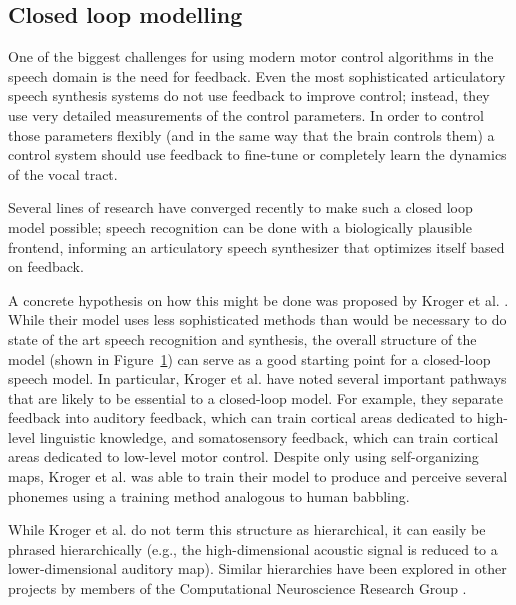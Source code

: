 \documentclass{article}
\begin{document}
\subsection{Closed loop modelling}

One of the biggest challenges
for using modern motor control algorithms
in the speech domain
is the need for feedback.
Even the most sophisticated
articulatory speech synthesis systems
do not use feedback to improve control;
instead, they use very detailed measurements
of the control parameters.
In order to control those parameters flexibly
(and in the same way that the brain controls them)
a control system should use feedback
to fine-tune or completely learn
the dynamics of the vocal tract.

Several lines of research have converged recently
to make such a closed loop model possible;
speech recognition can be done
with a biologically plausible frontend,
informing an articulatory speech synthesizer
that optimizes itself based on feedback.

A concrete hypothesis on how
this might be done was proposed by Kroger et al.
\citep{kroger2009}.
While their model uses less sophisticated
methods than would be necessary
to do state of the art speech
recognition and synthesis,
the overall structure of the model
(shown in Figure~\ref{fig:loop})
can serve as a good starting point
for a closed-loop speech model.
In particular, Kroger et al. have
noted several important pathways
that are likely to be essential
to a closed-loop model.
For example, they separate feedback
into auditory feedback,
which can train cortical areas
dedicated to high-level linguistic knowledge,
and somatosensory feedback,
which can train cortical areas
dedicated to low-level motor control.
Despite only using self-organizing maps,
Kroger et al. was able to train their model
to produce and perceive several phonemes
using a training method analogous
to human babbling.

\begin{figure}\begin{center}
  \label{fig:loop}
  \caption{}
\end{center}\end{figure}

While Kroger et al.
do not term this structure
as hierarchical,
it can easily be phrased hierarchically
(e.g., the high-dimensional acoustic
signal is reduced to a lower-dimensional
auditory map).
Similar hierarchies have been explored
in other projects by members of the
Computational Neuroscience Research Group
\citep[e.g.,]{eliasmith2012,dewolf2011,rasmussen-inpress}.
\end{document}
